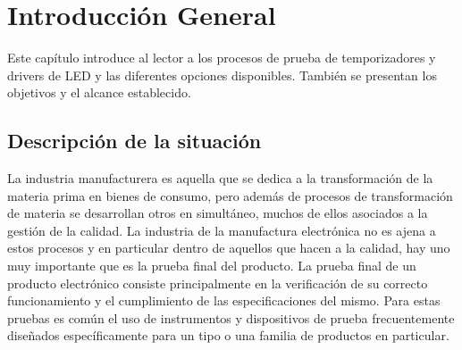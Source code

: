 
\chapter{Introducción General} %

\label{Chapter1} %


Este capítulo introduce al lector a los procesos de prueba de temporizadores y drivers de LED y las diferentes opciones disponibles. También se presentan los objetivos y el alcance establecido. 

\label{IntroGeneral}


\newcommand{\keyword}[1]{\textbf{#1}}
\newcommand{\tabhead}[1]{\textbf{#1}}
\newcommand{\code}[1]{\texttt{#1}}
\newcommand{\file}[1]{\texttt{\bfseries#1}}
\newcommand{\option}[1]{\texttt{\itshape#1}}
\newcommand{\grados}{$^{\circ}$}



\section{Descripción de la situación}

La industria manufacturera es aquella que se dedica a la transformación de la materia prima en bienes de consumo, pero además de procesos de transformación de materia se desarrollan otros en simultáneo, muchos de ellos asociados a la gestión de la calidad. La industria de la manufactura electrónica no es ajena a estos procesos y en particular dentro de aquellos que hacen a la calidad, hay uno muy importante que es la prueba final del producto. 
La prueba final de un producto electrónico consiste principalmente en la verificación de su correcto funcionamiento y el cumplimiento de las especificaciones del mismo. Para estas pruebas es común el uso de instrumentos y dispositivos de prueba frecuentemente diseñados específicamente para un tipo o una familia de productos en particular.

